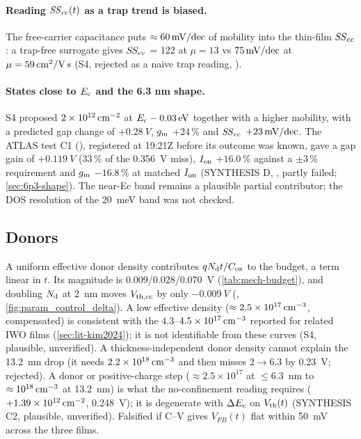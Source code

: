 \paragraph{Reading $\mathit{SS}_{\mathrm{cc}}(t)$ as a trap trend is biased.} The free-carrier capacitance puts $\approx 60\,\mathrm{mV/dec}$ of mobility into the thin-film $\mathit{SS}_{\mathrm{cc}}$: a trap-free surrogate gives $\mathit{SS}_{\mathrm{cc}}$ = 122 at $\mu = 13$ vs $75\,\mathrm{mV/dec}$ at $\mu = 59\,\mathrm{cm}^{2}/\mathrm{V\,s}$ (S4, rejected as a naive trap reading, \evSURR).

\paragraph{States close to $E_{\mathrm{c}}$ and the 6.3 nm shape.} S4 proposed $2\times10^{12}\,\mathrm{cm}^{-2}$ at $E_{\mathrm{c}} - \SI{0.03}{eV}$ together with a higher mobility, with a predicted gap change of $+\SI{0.28}{V}$, $g_{\mathrm{m}}$ $+24$\,\% and $\mathit{SS}_{\mathrm{cc}}$ $+23\,\mathrm{mV/dec}$. The ATLAS test C1 (), registered at 19:21Z before its outcome was known, gave a gap gain of $+\SI{0.119}{V}$ (33\,\% of the \SI{0.356}{V} miss), $I_{\mathrm{on}}$ $+16.0$\,\% against a $\pm3$\,\% requirement and $g_{\mathrm{m}}$ $-16.8$\,\% at matched $I_{\mathrm{on}}$ (SYNTHESIS D, \evOOS, partly failed; \cref{sec:6p3-shape}). The near-Ec band remains a plausible partial contributor; the DOS resolution of the \SI{20}{meV} band was not checked.

\subsection{Donors}
A uniform effective donor density contributes $qN_{\mathrm{d}} t/C_{\mathrm{ox}}$ to the budget, a term linear in $t$. Its magnitude is 0.009/0.028/\SI{0.070}{V} (\cref{tab:mech-budget}), and doubling $N_{\mathrm{d}}$ at \SI{2}{nm} moves $V_{\mathrm{th,cc}}$ by only $-\SI{0.009}{V}$ (, \cref{fig:param_control_delta}). A low effective density ($\approx 2.5\times10^{17}\,\mathrm{cm}^{-3}$, compensated) is consistent with the $4.3$--$4.5\times10^{17}\,\mathrm{cm}^{-3}$ reported for related IWO films (\cref{sec:lit-kim2024}); it is not identifiable from these curves (S4, plausible, unverified). A thickness-independent donor density cannot explain the \SI{13.2}{nm} drop (it needs $2.2\times10^{18}\,\mathrm{cm}^{-3}$ and then misses $2\rightarrow6.3$ by \SI{0.23}{V}; rejected). A donor or positive-charge step ($\approx 2.5\times10^{17}$ at $\le$\SI{6.3}{nm} to $\approx 10^{18}\,\mathrm{cm}^{-3}$ at \SI{13.2}{nm}) is what the no-confinement reading requires ($+1.39\times10^{12}\,\mathrm{cm}^{-2}$, \SI{0.248}{V}); it is degenerate with $\Delta E_{\mathrm{c}}$ on $V_{\mathrm{th}}(t)$ (SYNTHESIS C2, plausible, unverified). Falsified if C--V gives $V_{FB}(t)$ flat within \SI{50}{mV} across the three films.


